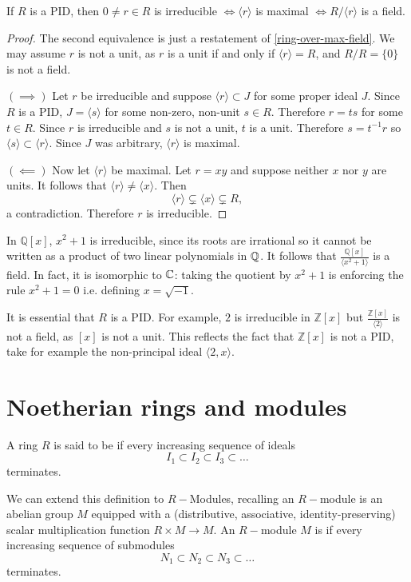 \begin{prop}\label{PID-over-irreducible-is-field}
If $R$ is a PID, then $0\neq r\in R$ is irreducible $\iff\langle r \rangle$ is maximal $\iff R/\langle r\rangle$ is a field.
\end{prop}
\begin{proof}
The second equivalence is just a restatement of \cref{ring-over-max-field}. We may assume $r$ is not a unit, as $r$ is a unit if and only if $\langle r\rangle=R$, and $R/R=\{0\}$ is not a field. 

$(\implies)$ Let $r$ be irreducible and suppose $\langle r\rangle \subset J$ for some proper ideal $J$. Since $R$ is a PID, $J=\langle s \rangle$ for some non-zero, non-unit $s\in R.$ Therefore $r=ts$ for some $t\in R$. Since $r$ is irreducible and $s$ is not a unit, $t$ is a unit. Therefore $s=t^{-1}r$ so $\langle s \rangle \subset \langle r \rangle.$ Since $J$ was arbitrary, $\langle r \rangle$ is maximal.

$(\impliedby)$ Now let $\langle r \rangle$ be maximal. Let $r=xy$ and suppose neither $x$ nor $y$ are units. It follows that $\langle r\rangle \neq \langle x \rangle$. Then $$\langle r\rangle \subsetneq \langle x \rangle \subsetneq R,$$ a contradiction. Therefore $r$ is irreducible.
\end{proof}

\begin{example}
In $\mathbb{Q}[x]$, $x^2+1$ is irreducible, since its roots are irrational so it cannot be written as a product of two linear polynomials in $\mathbb{Q}$. It follows that $\frac{\mathbb{Q}[x]}{\langle x^2+1\rangle}$ is a field. In fact, it is isomorphic to $\mathbb{C}$: taking the quotient by $x^2+1$ is enforcing the rule $x^2+1=0$ i.e. defining $x=\sqrt{-1}$. 
\end{example}

\begin{remark}
It is essential that $R$ is a PID. For example, $2$ is irreducible in $\mathbb{Z}[x]$ but $\frac{\mathbb{Z}[x]}{\langle 2\rangle}$ is not a field, as $[x]$ is not a unit. This reflects the fact that $\mathbb{Z}[x]$ is not a PID, take for example the non-principal ideal $\langle 2,x\rangle$.
\end{remark}

\section{Noetherian rings and modules}

\begin{definition}
A ring $R$ is said to be  if every increasing sequence of ideals $$I_1\subset I_2\subset I_3 \subset \dots$$
terminates. 

We can extend this definition to $R-$Modules, recalling an $R-$module is an abelian group $M$ equipped with a (distributive, associative, identity-preserving) scalar multiplication function $R\times M\rightarrow M$. An $R-$module $M$ is  if every increasing sequence of submodules $$N_1\subset N_2\subset N_3\subset \dots$$ terminates.
\end{definition}

